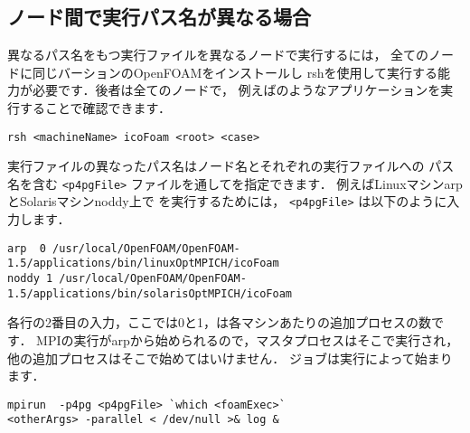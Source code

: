 \subsection{ノード間で実行パス名が異なる場合}
\label{ssec:B.1.2}
異なるパス名をもつ実行ファイルを異なるノードで実行するには，
全てのノードに同じバーションのOpenFOAMをインストールし
rshを使用して実行する能力が必要です．後者は全てのノードで，
例えばのようなアプリケーションを実行することで確認できます．
\begin{OFterminal}
\begin{verbatim}
rsh <machineName> icoFoam <root> <case>
\end{verbatim}
\end{OFterminal}
実行ファイルの異なったパス名はノード名とそれぞれの実行ファイルへの
パス名を含む \verb|<p4pgFile>| ファイルを通してを指定できます．
例えばLinuxマシンarpとSolarisマシンnoddy上で
を実行するためには，
\verb|<p4pgFile>| は以下のように入力します．
\begin{OFfile}
\begin{verbatim}
arp  0 /usr/local/OpenFOAM/OpenFOAM-1.5/applications/bin/linuxOptMPICH/icoFoam
noddy 1 /usr/local/OpenFOAM/OpenFOAM-1.5/applications/bin/solarisOptMPICH/icoFoam
\end{verbatim}
\end{OFfile}
各行の2番目の入力，ここでは0と1，は各マシンあたりの追加プロセスの数です．
MPIの実行がarpから始められるので，マスタプロセスはそこで実行され，
他の追加プロセスはそこで始めてはいけません．
ジョブは実行によって始まります．
\begin{OFterminal}
\begin{verbatim}
mpirun  -p4pg <p4pgFile> `which <foamExec>`
<otherArgs> -parallel < /dev/null >& log &
\end{verbatim}
\end{OFterminal}
